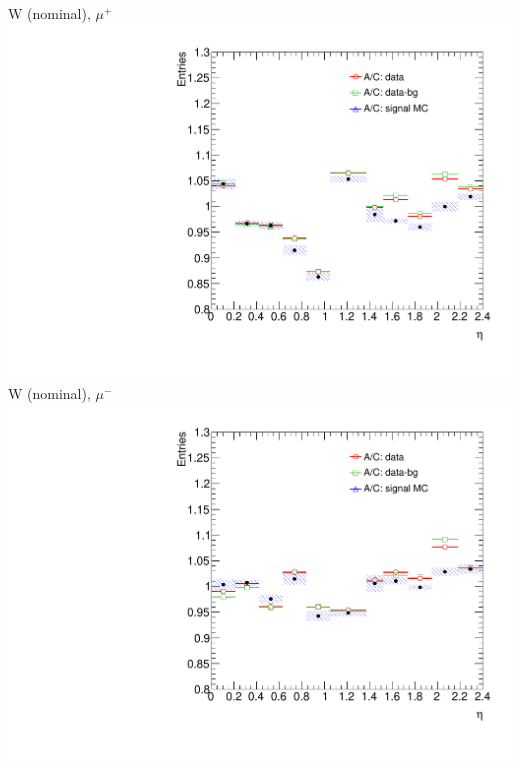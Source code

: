  {
\colb[T]
\centering
\small{ W (nominal), $\mu^{+}$}
\includegraphics[width=1.0\textwidth]{dates/20130306/figures/both/W_NOM_Q0_stack_d3_eta_lpt_met_y_2__1_z_0__1_POS}
\centering
\small{ W (nominal), $\mu^{-}$}
\includegraphics[width=1.0\textwidth]{dates/20130306/figures/both/W_NOM_Q0_stack_d3_eta_lpt_met_y_2__1_z_0__1_NEG}
\cole
}

